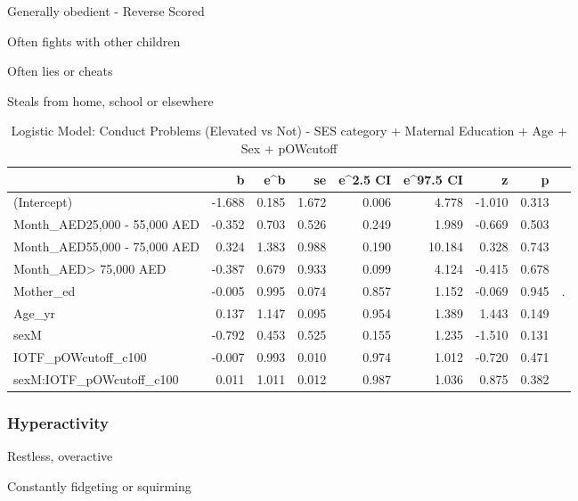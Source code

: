 \documentclass[
]{article}
\begin{document}
Generally obedient - Reverse Scored

Often fights with other children

Often lies or cheats

Steals from home, school or elsewhere

\FloatBarrier

\begin{table}[!h]

\caption{\label{tab:IOTF_pOWcutoff_conductprobs_elevated_logit}Logistic Model: Conduct Problems (Elevated vs Not) - SES category + Maternal Education + Age + Sex + pOWcutoff}
\centering
\begin{tabular}[t]{lrrrrrrrl}
\toprule
  & b & e\textasciicircum{}b & se & e\textasciicircum{}2.5 CI & e\textasciicircum{}97.5 CI & z & p &  \\
\midrule
(Intercept) & -1.688 & 0.185 & 1.672 & 0.006 & 4.778 & -1.010 & 0.313 & \\
Month\_AED25,000 - 55,000 AED & -0.352 & 0.703 & 0.526 & 0.249 & 1.989 & -0.669 & 0.503 & \\
Month\_AED55,000 - 75,000 AED & 0.324 & 1.383 & 0.988 & 0.190 & 10.184 & 0.328 & 0.743 & \\
Month\_AED> 75,000 AED & -0.387 & 0.679 & 0.933 & 0.099 & 4.124 & -0.415 & 0.678 & \\
Mother\_ed & -0.005 & 0.995 & 0.074 & 0.857 & 1.152 & -0.069 & 0.945 & .\\
\addlinespace
Age\_yr & 0.137 & 1.147 & 0.095 & 0.954 & 1.389 & 1.443 & 0.149 & \\
sexM & -0.792 & 0.453 & 0.525 & 0.155 & 1.235 & -1.510 & 0.131 & \\
IOTF\_pOWcutoff\_c100 & -0.007 & 0.993 & 0.010 & 0.974 & 1.012 & -0.720 & 0.471 & \\
sexM:IOTF\_pOWcutoff\_c100 & 0.011 & 1.011 & 0.012 & 0.987 & 1.036 & 0.875 & 0.382 & \\
\bottomrule
\end{tabular}
\end{table}

\FloatBarrier

\hypertarget{hyperactivity}{%
\subsubsection{Hyperactivity}\label{hyperactivity}}

Restless, overactive

Constantly fidgeting or squirming
\end{document}
